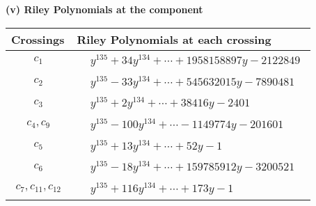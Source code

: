 \documentclass[1p]{elsarticle_modified}
\theoremstyle{definition}
\begin{document}
\newpage\renewcommand{\arraystretch}{1}
\flushleft \textbf{(v) Riley Polynomials at the component}\newline \\
\begin{tabular}{m{50pt}|m{274pt}}
Crossings & \hspace{64pt}Riley Polynomials at each crossing \\
\hline $$\begin{aligned}c_{1}\end{aligned}$$&$\begin{aligned}
&y^{135}+34 y^{134}+\cdots+1958158897 y-2122849
\end{aligned}$\\
\hline $$\begin{aligned}c_{2}\end{aligned}$$&$\begin{aligned}
&y^{135}-33 y^{134}+\cdots+545632015 y-7890481
\end{aligned}$\\
\hline $$\begin{aligned}c_{3}\end{aligned}$$&$\begin{aligned}
&y^{135}+2 y^{134}+\cdots+38416 y-2401
\end{aligned}$\\
\hline $$\begin{aligned}c_{4},c_{9}\end{aligned}$$&$\begin{aligned}
&y^{135}-100 y^{134}+\cdots-1149774 y-201601
\end{aligned}$\\
\hline $$\begin{aligned}c_{5}\end{aligned}$$&$\begin{aligned}
&y^{135}+13 y^{134}+\cdots+52 y-1
\end{aligned}$\\
\hline $$\begin{aligned}c_{6}\end{aligned}$$&$\begin{aligned}
&y^{135}-18 y^{134}+\cdots+159785912 y-3200521
\end{aligned}$\\
\hline $$\begin{aligned}c_{7},c_{11},c_{12}\end{aligned}$$&$\begin{aligned}
&y^{135}+116 y^{134}+\cdots+173 y-1
\end{aligned}$\\

\end{tabular}
\end{document}
